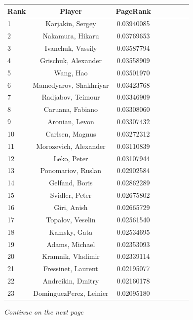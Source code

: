 \documentclass[pdftex,11pt,a4paper]{report}
\begin{document}
\begin{singlespace}
\begin{tabular}{l*{6}{c}r}
Rank & Player & PageRank \\ 
\hline

1 & Karjakin, Sergey & 0.03940085 \\
2 & Nakamura, Hikaru & 0.03769653 \\
3 & Ivanchuk, Vassily & 0.03587794 \\
4 & Grischuk, Alexander & 0.03558909 \\
5 & Wang, Hao & 0.03501970 \\
6 & Mamedyarov, Shakhriyar & 0.03423768 \\
7 & Radjabov, Teimour & 0.03346909 \\
8 & Caruana, Fabiano & 0.03308060 \\
9 & Aronian, Levon & 0.03307432 \\
10 & Carlsen, Magnus & 0.03272312 \\
11 & Morozevich, Alexander & 0.03110839 \\
12 & Leko, Peter & 0.03107944 \\
13 & Ponomariov, Ruslan & 0.02902584 \\
14 & Gelfand, Boris & 0.02862289 \\
15 & Svidler, Peter & 0.02675802 \\
16 & Giri, Anish & 0.02665729 \\
17 & Topalov, Veselin & 0.02561540 \\
18 & Kamsky, Gata & 0.02534695 \\
19 & Adams, Michael & 0.02353093 \\
20 & Kramnik, Vladimir & 0.02339114 \\
21 & Fressinet, Laurent & 0.02195077 \\
22 & Andreikin, Dmitry & 0.02160178 \\
23 & DominguezPerez, Leinier & 0.02095180 \\


\end{tabular}

\end{singlespace}
\emph{Continue on the next page}
\end{document}

